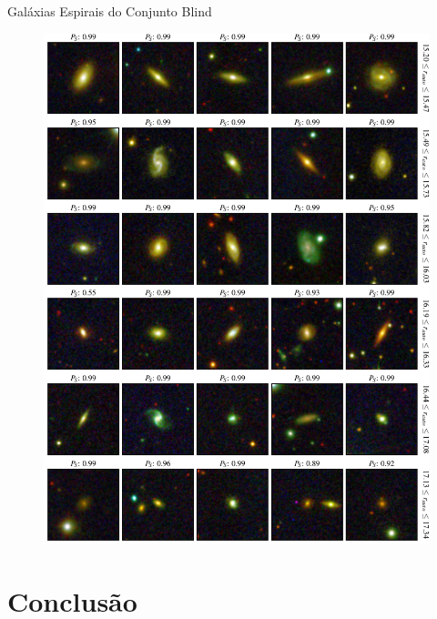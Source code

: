 \documentclass[10pt,xcolor=svgnames]{beamer}
\begin{document}
\begin{frame}{Galáxias Espirais do Conjunto Blind}
\begin{minipage}{0.49\textwidth}
\begin{figure}
      \includegraphics[width=\linewidth]{figures/blind_preds_spir_2.pdf}
    \end{figure}
  \end{minipage}
\end{frame}

{
\AtBeginSection{}
\section{Conclusão}
}
\end{document}
